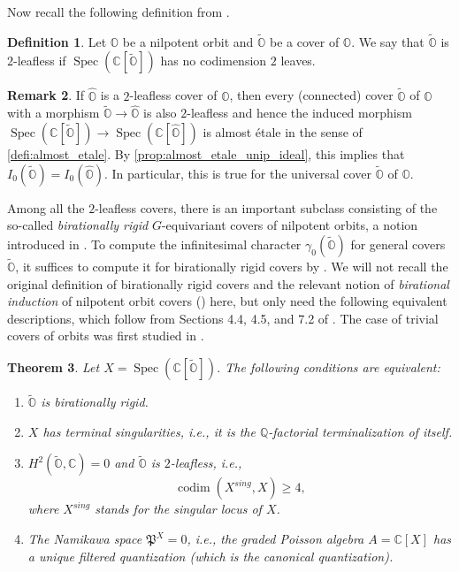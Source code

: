 \documentclass[11pt, a4paper]{amsart}
\newcommand{\C}{\mathbb{C}}
\newcommand{\bQ}{\mathbb{Q}}
\newcommand{\orb}{\mathbb{O}}
\newcommand{\fP}{\mathfrak{P}}
\DeclareMathOperator{\codim}{codim}
\newcommand{\spec}{\operatorname{Spec}}
\newtheorem{Thm}{Theorem}[subsection]
\theoremstyle{definition}
\newtheorem{defi}[Thm]{Definition}
\newtheorem{Rem}[Thm]{Remark}
\numberwithin{equation}{section}
\begin{document}
Now recall the following definition from \cite[Definition 7.29]{LMBM}.

\begin{defi}
    Let $\orb$ be a nilpotent orbit and $\widetilde{\orb}$ be a cover of $\orb$. We say that $\widetilde{\orb}$ is $2$-leafless if $\spec(\C[\widetilde{\orb}])$ has no codimension $2$ leaves.
\end{defi}

\begin{Rem} \label{rem:2_leafless_covers}
	If $\widehat{\orb}$ is a $2$-leafless cover of $\orb$, then every (connected) cover $\widetilde{\orb}$ of $\orb$ with a morphism $\widetilde{\orb} \to \widehat{\orb}$ is also $2$-leafless and hence the induced morphism $\spec(\C[\widetilde{\orb}]) \to \spec(\C[\widehat{\orb}])$ is almost \'{e}tale in the sense of \cref{defi:almost_etale}. By \cref{prop:almost_etale_unip_ideal}, this implies that $I_0(\widetilde{\orb}) = I_0(\widehat{\orb})$. In particular, this is true for the universal cover $\widetilde{\orb}$ of $\orb$.
\end{Rem}

Among all the $2$-leafless covers, there is an important subclass consisting of the so-called \emph{birationally rigid} $G$-equivariant covers of nilpotent orbits, a notion introduced in \cite[Section 2.4]{LMBM}. To compute the infinitesimal character $\gamma_0(\widetilde{\orb})$ for general covers $\widetilde{\orb}$, it suffices to compute it for birationally rigid covers by \cite[Proposition 8.1.1]{LMBM}.
We will not recall the original definition of birationally rigid covers and the relevant notion of {\it birational induction} of nilpotent orbit covers (\cite[Section 2.4]{LMBM}) here, but only need the following equivalent descriptions, which follow from Sections 4.4, 4.5, and 7.2 of \cite{LMBM}. The case of trivial covers of orbits was first studied in \cite[Proposition 4.5]{Losev:quan_symp_orbit}.

\begin{Thm} \label{thm:birigid}
	Let $X = \spec(\C[\widetilde{\orb}])$. The following conditions are equivalent:
	\begin{enumerate}
		\item $\widetilde{\orb}$ is birationally rigid.
		\item $X$ has terminal singularities, i.e., it is the $\bQ$-factorial terminalization of itself.
		\item $H^2(\widetilde{\orb}, \C) = 0$ and $\widetilde{\orb}$ is $2$-leafless, i.e.,
		\begin{equation} \label{eq:codim_4}
			\codim(X^{sing}, X) \geqslant 4,
		\end{equation}
		where $X^{sing}$ stands for the singular locus of $X$.
		\item The Namikawa space $\fP^X = 0$, i.e., the graded Poisson algebra $A = \C[X]$ has a unique filtered quantization (which is the canonical quantization).
	\end{enumerate}
\end{Thm}
\end{document}
